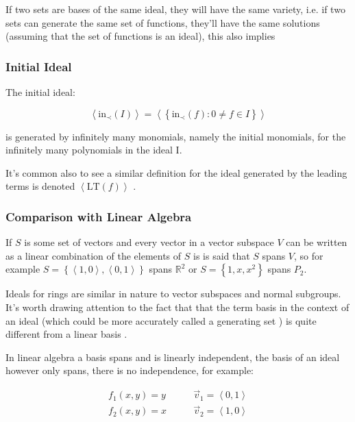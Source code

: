\documentclass[a4paper,11pt,twoside]{article}
\begin{document}
If two sets are bases of the same ideal, they will have the same
variety, i.e. if two sets can generate the same set of functions,
they'll have the same solutions (assuming that the set of
functions is an ideal), this also implies


\subsubsection{Initial Ideal}
\label{sec:org445b6b1}
The initial ideal:

\[\left\langle
  \mathrm{in}_{\prec}\left(I\right)\right\rangle =\left\langle
  \left\{ \mathrm{in}_{\prec}\left(f\right):0\neq f\in I\right\}
  \right\rangle \]

is generated by infinitely many monomials, namely
the initial monomials, for the infinitely many polynomials in the
ideal I. \cite[\S 1.1.5]{hibiGrobnerBasesStatistics2014}

It's common also to see a similar definition for the ideal
generated by the leading terms is denoted \(\left\langle
  \mathrm{LT}\left(f\right)\right\rangle\) \cite[\S 2.5]{coxIdealsVarietiesAlgorithms1997}.

\subsubsection{Comparison with Linear Algebra}
\label{sec:org76c6b95}
If \(S\) is some set of vectors and every vector in a vector
subspace \(V\) can be written as a linear combination of the
elements of \(S\) is is said that \(S\) spans \(V\), so for
example \(S=\left\{ \left\langle 1,0\right\rangle ,\left\langle
    0,1\right\rangle \right\}\) spans \(\mathbb{R}^2\) or
\(S=\left\{1, x, x^2\right\}\) spans \(P_2\).

Ideals for rings are similar in nature to vector subspaces and
normal subgroups. It's worth drawing attention to the fact that
that the term basis in the context of an ideal (which could be
more accurately called a generating set
\cite{sturmfelsSolvingSystemsPolynomial2002}) is quite different
from a linear basis \cite[p. 35]{coxIdealsVarietiesAlgorithms1997}.

In linear algebra a basis spans and is linearly independent, the
basis of an ideal however only spans, there is no independence,
for example:

$$\begin{aligned}
  f_{1}\left(x,y\right)=y\quad  \quad & \vec{v}_{1}=\left\langle 0,1\right\rangle \\
  f_{2}\left(x,y\right)=x \quad \quad & \vec{v}_{2}=\left\langle
  1,0\right\rangle \end{aligned}$$    
\end{document}
